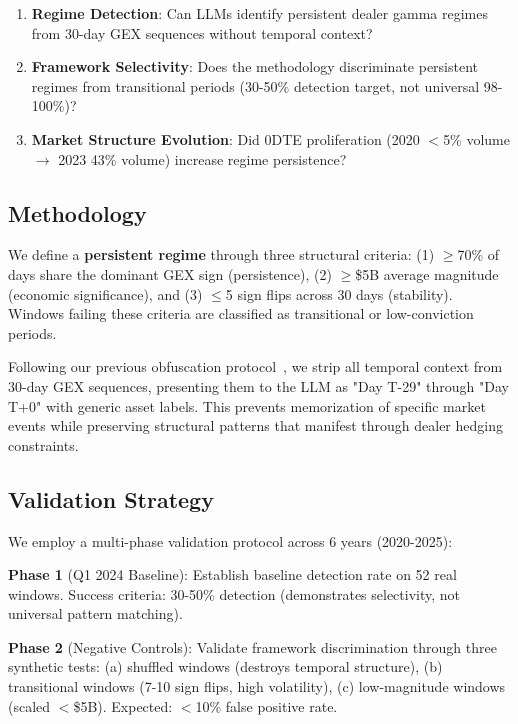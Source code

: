 \begin{enumerate}
\item \textbf{Regime Detection}: Can LLMs identify persistent dealer gamma regimes from 30-day GEX sequences without temporal context?
\item \textbf{Framework Selectivity}: Does the methodology discriminate persistent regimes from transitional periods (30-50\% detection target, not universal 98-100\%)?
\item \textbf{Market Structure Evolution}: Did 0DTE proliferation (2020 $<$5\% volume $\rightarrow$ 2023 43\% volume) increase regime persistence?
\end{enumerate}

\subsection{Methodology}

We define a \textbf{persistent regime} through three structural criteria: (1) $\geq$70\% of days share the dominant GEX sign (persistence), (2) $\geq$\$5B average magnitude (economic significance), and (3) $\leq$5 sign flips across 30 days (stability). Windows failing these criteria are classified as transitional or low-conviction periods.

Following our previous obfuscation protocol~\cite{regan2025obfuscation}, we strip all temporal context from 30-day GEX sequences, presenting them to the LLM as "Day T-29" through "Day T+0" with generic asset labels. This prevents memorization of specific market events while preserving structural patterns that manifest through dealer hedging constraints.

\subsection{Validation Strategy}

We employ a multi-phase validation protocol across 6 years (2020-2025):

\textbf{Phase 1} (Q1 2024 Baseline): Establish baseline detection rate on 52 real windows. Success criteria: 30-50\% detection (demonstrates selectivity, not universal pattern matching).

\textbf{Phase 2} (Negative Controls): Validate framework discrimination through three synthetic tests: (a) shuffled windows (destroys temporal structure), (b) transitional windows (7-10 sign flips, high volatility), (c) low-magnitude windows (scaled $<$\$5B). Expected: $<$10\% false positive rate.

